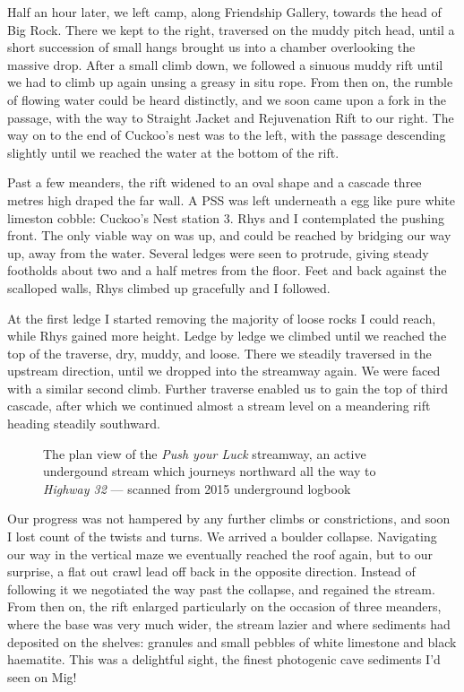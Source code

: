 Half an hour later, we left camp, along Friendship Gallery, towards the head of Big Rock. There we kept to the right, traversed on the muddy pitch head, until a short succession of small hangs brought us into a chamber overlooking the massive drop. After a small climb down, we followed a sinuous muddy rift until we had to climb up again unsing a greasy in situ rope. From then on, the rumble of flowing water could be heard distinctly, and we soon came upon a fork in the passage, with the way to Straight Jacket and Rejuvenation Rift to our right. The way on to the end of Cuckoo's nest was to the left, with the passage descending slightly until we reached the water at the bottom of the rift.



Past a few meanders, the rift widened to an oval shape and a cascade three metres high draped the far wall. A PSS was left underneath a egg like pure white limeston cobble: Cuckoo's Nest station 3. Rhys and I contemplated the pushing front. The only viable way on was up, and could be reached by bridging our way up, away from the water. Several ledges were seen to protrude, giving steady footholds about two and a half metres from the floor. Feet and back against the scalloped walls, Rhys  climbed up gracefully and I followed.

At the first ledge I started removing the majority of loose rocks I could reach, while Rhys gained more height. Ledge by ledge we climbed until we reached the top of the traverse, dry, muddy, and loose. There we steadily traversed in the upstream direction, until we dropped into the streamway again. We were faced with a similar second climb. Further traverse enabled us to gain the top of third cascade, after which we continued almost a stream level on a meandering rift heading steadily southward.

\begin{figure}[t!]
\checkoddpage \ifoddpage \forcerectofloat \else \forceversofloat \fi
\centering
{}
\caption{The plan view of the \emph{Push your Luck} streamway, an active undergound stream which journeys northward all the way to \emph{Highway 32} --- scanned from 2015 underground logbook}
\label{}
\end{figure}

Our progress was not hampered by any further climbs or constrictions, and soon I lost count of the twists and turns. We arrived a boulder collapse. Navigating our way in the vertical maze we eventually reached the roof again, but to our surprise, a flat out crawl lead off back in the opposite direction. Instead of following it we negotiated the way past the collapse, and regained the stream. From then on, the rift enlarged particularly on the occasion of three meanders, where the base was very much wider, the stream lazier and where sediments had deposited on the shelves: granules and small pebbles of white limestone and black haematite. This was a delightful sight, the finest photogenic cave sediments I'd seen on Mig! 

